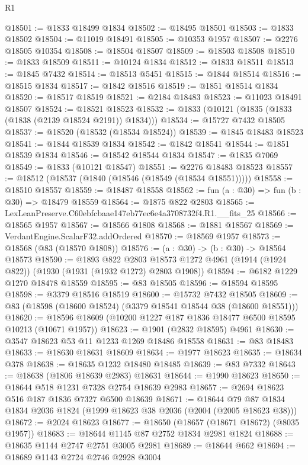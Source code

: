 \begin{lexlean}{R1}
\begin{coremodule}
@18501 := @1833 @18499 @1834
@18502 := @18495 @18501
@18503 := @1833 @18502
@18504 := @11019 @18491
@18505 := @10353 @1957
@18507 := @2276 @18505 @10354
@18508 := @18504 @18507
@18509 := @18503 @18508
@18510 := @1833 @18509
@18511 := @10124 @1834
@18512 := @1833 @18511
@18513 := @1845 @7432
@18514 := @18513 @5451
@18515 := @1844 @18514
@18516 := @18515 @1834
@18517 := @1842 @18516
@18519 := @1851 @18514 @1834
@18520 := @18517 @18519
@18521 := @2184 @18483
@18523 := @11023 @18491 @18507
@18524 := @18521 @18523
@18532 := @1833 (@10121 (@1835 (@1833 (@1838 (@2139 @18524 @2191)) @1834)))
@18534 := @15727 @7432 @18505
@18537 := @18520 (@18532 (@18534 @18524))
@18539 := @1845 @18483 @18523
@18541 := @1844 @18539 @1834
@18542 := @1842 @18541
@18544 := @1851 @18539 @1834
@18546 := @18542 @18544 @1834
@18547 := @1835 @7069
@18549 := @1833 (@10121 @18547)
@18551 := @2276 @18483 @18523
@18557 := @18512 (@18537 (@1840 (@18546 (@18549 (@18534 @18551)))))
@18558 := @18510 @18557
@18559 := @18487 @18558
@18562 := fun (a : @30) => fun (b : @30) => @18479 @18559
@18564 := @1875 @822 @2803
@18565 := LexLeanPreserve.C60ebfcbaae147eb77ec6e4a3708732f4.R1.__fits_25
@18566 := @18565 @1957
@18567 := @18566 @1808
@18568 := @1881 @18567
@18569 := VerdantEngine.ScalarF32.addOrdered
@18570 := @18569 @1957
@18573 := @18568 (@83 (@18570 @1808))
@18576 := (a : @30) -> (b : @30) -> @18564 @18573
@18590 := @1893
    @822
    @2803
    @18573
    @1272
    @4961
    (@1914 (@1924 @822))
    (@1930 (@1931 (@1932 @1272) @2803 @1908))
@18594 := @6182 @1229 @1270 @18478 @18559
@18595 := @83 @18505
@18596 := @18594 @18595
@18598 := @3379 @18516 @18519
@18600 := @15732 @7432 @18505
@18609 := @83 (@18598 (@18600 @18524) (@3379 @18541 @18544 @38 (@18600 @18551)))
@18620 := @18596 @18609 (@10200 @1227 @187 @1836 @18477 @6500 @18595 @10213 (@10671 @1957))
@18623 := @1901 (@2832 @18595) @4961
@18630 := @3547 @18623 @53 @11 @1233 @1269 @18486 @18558
@18631 := @83 @18483
@18633 := @18630 @18631 @18609
@18634 := @1977 @18623
@18635 := @18634 @378
@18638 := @18635 @1232 @18480 @18485
@18639 := @83 @7332
@18643 := @18638 (@1806 @18639 @2983) @18631
@18644 := @1990 @18623
@18650 := @18644 @518 @1231 @7328 @2754 @18639 @2983
@18657 := @2694 @18623 @516 @187 @1836 @7327 @6500 @18639
@18671 := @18644 @79 @87 @1834 @1834 @2036 @1824 (@1999 @18623 @38 @2036 (@2004 (@2005 @18623 @38)))
@18672 := @2024 @18623
@18677 := @18650 (@18657 (@18671 @18672) (@8035 @1957))
@18683 := @18644 @1145 @87 @2752 @1834 @2981 @1824
@18688 := @18635 @1144 @2747 @2751 @3005 @2981
@18689 := @18644 @662
@18694 := @18689 @1143 @2724 @2746 @2928 @3004

\end{coremodule}
\end{lexlean}
